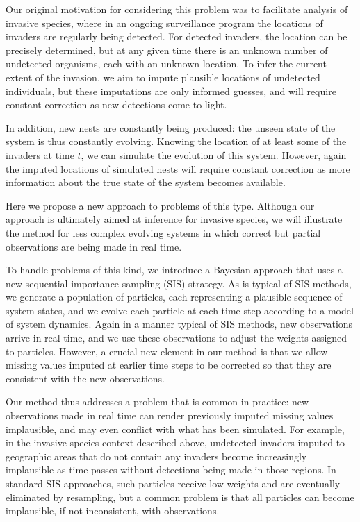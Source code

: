 Our original motivation for considering this problem was to facilitate analysis of {\color{blue} invasive species, where in an ongoing surveillance program the locations of invaders are regularly being detected. For detected invaders, the location can be precisely determined, but at any given time there is an unknown number of undetected organisms}, each with an unknown location. To infer the current extent of the invasion, we aim to impute plausible locations of undetected individuals, but these imputations are only informed guesses, and will require constant correction as new detections come to light.

In addition, new nests are constantly being produced: the unseen state of the system is thus constantly evolving. Knowing the location of at least some of the invaders at time $t$, we can simulate the evolution of this system. However, again the imputed locations of simulated nests will require constant correction as more information about the true state of the system becomes available.

Here we propose a new approach to problems of this type. Although our approach is ultimately aimed at inference for invasive species, we will illustrate the method for less complex evolving systems in which correct but partial observations are being made in real time.

To handle problems of this kind, we introduce a Bayesian approach that uses a new sequential importance sampling (SIS) strategy. As is typical of SIS methods, we generate a population of particles, each representing a plausible sequence of system states, and we evolve each particle at each time step according to a model of system dynamics. Again in a manner typical of SIS methods, new observations arrive in real time, and we use these observations to adjust the weights assigned to particles. However, a crucial new element in our method is that we allow missing values imputed at earlier time steps to be corrected so that they are consistent with the new observations.

Our method thus addresses a problem that is common in practice: new observations made in real time can render previously imputed missing values implausible, and may even conflict with what has been simulated. For example, in the invasive species context described above, undetected {\color{blue} invaders} imputed to geographic areas that do not contain any {\color{blue}invaders} become increasingly implausible as time passes without detections being made in those regions. In standard SIS approaches, such particles receive low weights and are eventually eliminated by resampling, but a common problem is that all particles can become implausible, if not inconsistent, with observations.

